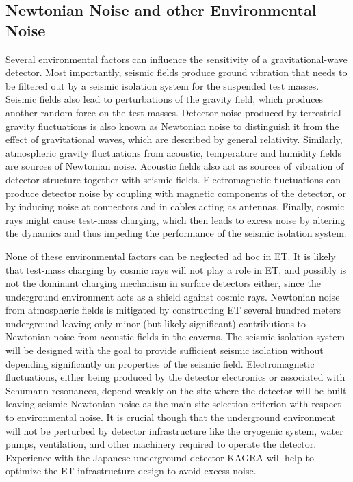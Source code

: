 \subsection {Newtonian Noise and other Environmental Noise}
\label{sec:envnoise}
Several environmental factors can influence the sensitivity of a gravitational-wave detector. Most importantly, seismic fields produce ground vibration that needs to be filtered out by a seismic isolation system for the suspended test masses. Seismic fields also lead to perturbations of the gravity field, which produces another random force on the test masses. Detector noise produced by terrestrial gravity fluctuations is also known as Newtonian noise to distinguish it from the effect of gravitational waves, which are described by general relativity. Similarly, atmospheric gravity fluctuations from acoustic, temperature and humidity fields are sources of Newtonian noise. Acoustic fields also act as sources of vibration of detector structure together with seismic fields. Electromagnetic fluctuations can produce detector noise by coupling with magnetic components of the detector, or by inducing noise at connectors and in cables acting as antennas. Finally, cosmic rays might cause test-mass charging, which then leads to excess noise by altering the dynamics and thus impeding the performance of the seismic isolation system. 

None of these environmental factors can be neglected ad hoc in ET. It is likely that test-mass charging by cosmic rays will not play a role in ET, and possibly is not the dominant charging mechanism in surface detectors either, since the underground environment acts as a shield against cosmic rays. Newtonian noise from atmospheric fields is mitigated by constructing ET several hundred meters underground leaving only minor (but likely significant) contributions to Newtonian noise from acoustic fields in the caverns. The seismic isolation system will be designed with the goal to provide sufficient seismic isolation without depending significantly on properties of the seismic field. Electromagnetic fluctuations, either being produced by the detector electronics or associated with Schumann resonances, depend weakly on the site where the detector will be built leaving seismic Newtonian noise as the main site-selection criterion with respect to environmental noise. It is crucial though that the underground environment will not be perturbed by detector infrastructure like the cryogenic system, water pumps, ventilation, and other machinery required to operate the detector. Experience with the Japanese underground detector KAGRA will help to optimize the ET infrastructure design to avoid excess noise.

